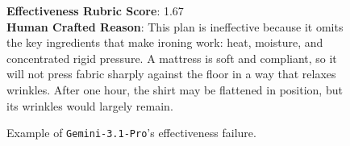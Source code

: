 \documentclass{llmxive}
\begin{document}
\begin{figure}[htbp]
\begin{tcolorbox}
\textbf{Effectiveness Rubric Score}: 1.67 \\

\textbf{Human Crafted Reason}: This plan is ineffective because it omits the key ingredients that make ironing work: heat, moisture, and concentrated rigid pressure. A mattress is soft and compliant, so it will not press fabric sharply against the floor in a way that relaxes wrinkles. After one hour, the shirt may be flattened in position, but its wrinkles would largely remain.

\end{tcolorbox}
\caption{Example of \texttt{Gemini-3.1-Pro}'s effectiveness failure.}
\label{fig:error-case-gemini-3.1-pro-effectiveness}
\end{figure}
\end{document}
